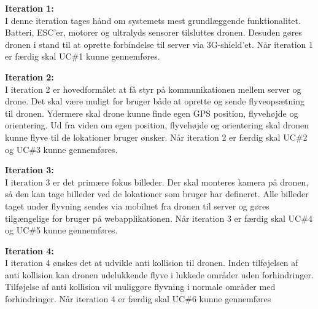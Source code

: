 \textbf{Iteration 1:} \\
I denne iteration tages hånd om systemets mest grundlæggende funktionalitet. Batteri, ESC'er, motorer og ultralyds sensorer tilsluttes dronen. Desuden gøres dronen i stand til at oprette forbindelse til server via 3G-shield'et. Når iteration 1 er færdig skal UC\#1 kunne gennemføres.  

\textbf{Iteration 2:} \\
I iteration 2 er hovedformålet at få styr på kommunikationen mellem server og drone. Det skal være muligt for bruger både at oprette og sende flyveopsætning til dronen. 
Ydermere skal drone kunne finde egen GPS position, flyvehøjde og orientering. Ud fra viden om egen position, flyvehøjde og orientering skal dronen kunne flyve til de lokationer bruger ønsker. Når iteration 2 er færdig skal UC\#2 og UC\#3 kunne gennemføres.  

\textbf{Iteration 3:}  \\
I iteration 3 er det primære fokus billeder. Der skal monteres kamera på dronen, så den kan tage billeder ved de lokationer som bruger har defineret. Alle billeder taget under flyvning sendes via mobilnet fra dronen til server og gøres tilgængelige for bruger på webapplikationen. Når iteration 3 er færdig skal UC\#4 og UC\#5 kunne gennemføres.

\textbf{Iteration 4:} \\
I iteration 4 ønskes det at udvikle anti kollision til dronen. 
Inden tilføjelsen af anti kollision kan dronen udelukkende flyve i lukkede områder uden forhindringer. Tilføjelse af anti kollision vil muliggøre flyvning i normale områder med forhindringer. Når iteration 4 er færdig skal UC\#6 kunne gennemføres  